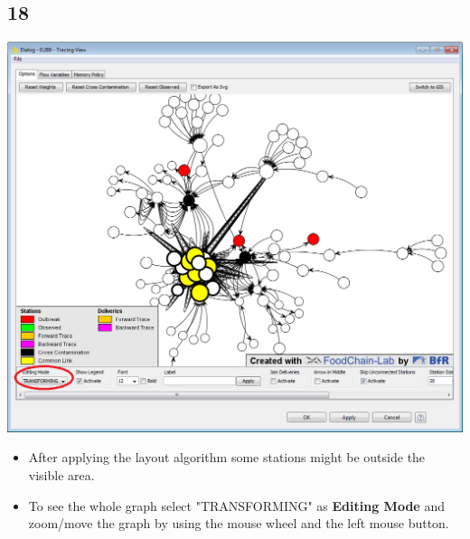 \documentclass{beamer}
\begin{document}
\subsection{18}
\begin{frame}
	\begin{center}
  		\includegraphics[height=0.6\textheight]{18.png}
	\end{center}
	\begin{itemize}
		\item After applying the layout algorithm some stations might be outside the visible area.
		\item To see the whole graph select "TRANSFORMING" as \textbf{Editing Mode} and zoom/move the graph by using the mouse wheel and the left mouse button.
	\end{itemize}
\end{frame}
\end{document}
